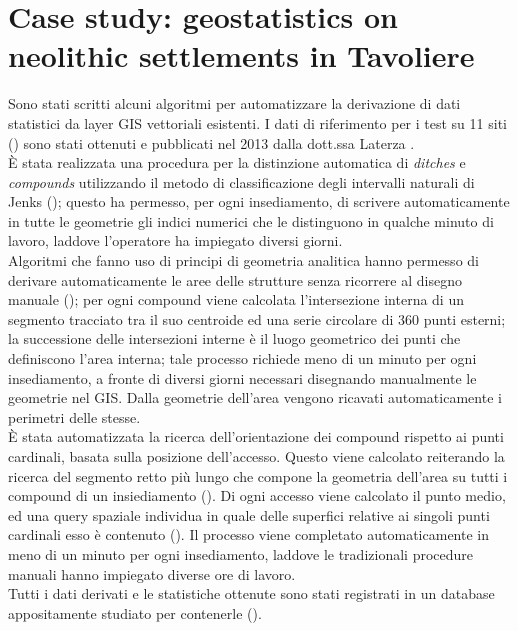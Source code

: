 \chapter{Case study: geostatistics on neolithic settlements in Tavoliere}

    \vspace{0.05\textheight}
    \begin{chaptersum}
        Sono stati scritti alcuni algoritmi per automatizzare la derivazione di dati statistici da layer GIS vettoriali esistenti. I dati di riferimento per i test su 11 siti () sono stati ottenuti e pubblicati nel 2013 dalla dott.ssa Laterza \cite{laterza}.\\
        È stata realizzata una procedura per la distinzione automatica di \emph{ditches} e \emph{compounds} utilizzando il metodo di classificazione degli intervalli naturali di Jenks (); questo ha permesso, per ogni insediamento, di scrivere automaticamente in tutte le geometrie gli indici numerici che le distinguono in qualche minuto di lavoro, laddove l'operatore ha impiegato diversi giorni.\\
        Algoritmi che fanno uso di principi di geometria analitica hanno permesso di derivare automaticamente le aree delle strutture senza ricorrere al disegno manuale (); per ogni compound viene calcolata l'intersezione interna di un segmento tracciato tra il suo centroide ed una serie circolare di 360 punti esterni; la successione delle intersezioni interne è il luogo geometrico dei punti che definiscono l'area interna; tale processo richiede meno di un minuto per ogni insediamento, a fronte di diversi giorni necessari disegnando manualmente le geometrie nel GIS. Dalla geometrie dell'area vengono ricavati automaticamente i perimetri delle stesse.\\
        È stata automatizzata la ricerca dell'orientazione dei compound rispetto ai punti cardinali, basata sulla posizione dell'accesso. Questo viene calcolato reiterando la ricerca del segmento retto più lungo che compone la geometria dell'area su tutti i compound di un insiediamento (). Di ogni accesso viene calcolato il punto medio, ed una query spaziale individua in quale delle superfici relative ai singoli punti cardinali esso è contenuto (). Il processo viene completato automaticamente in meno di un minuto per ogni insediamento, laddove le tradizionali procedure manuali hanno impiegato diverse ore di lavoro.\\
        Tutti i dati derivati e le statistiche ottenute sono stati registrati in un database appositamente studiato per contenerle ().
    \end{chaptersum}

